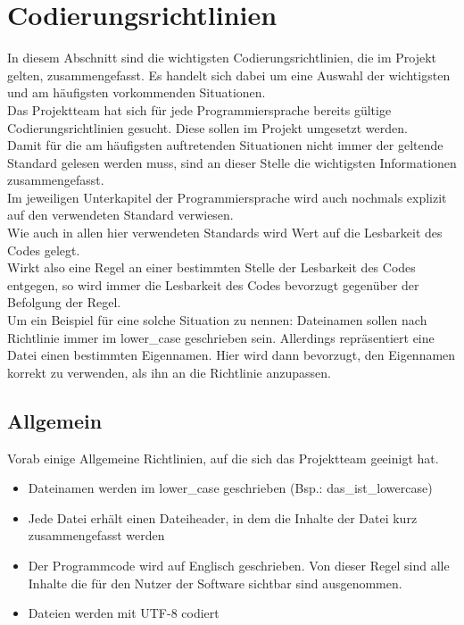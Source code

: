 
\chapter{Codierungsrichtlinien}
In diesem Abschnitt sind die wichtigsten Codierungsrichtlinien, die im Projekt gelten, zusammengefasst. Es handelt sich dabei um eine Auswahl der wichtigsten und am häufigsten vorkommenden Situationen.\\

Das Projektteam hat sich für jede Programmiersprache bereits gültige Codierungsrichtlinien gesucht. Diese sollen im Projekt umgesetzt werden. \\

Damit für die am häufigsten auftretenden Situationen nicht immer der geltende Standard gelesen werden muss, sind an dieser Stelle die wichtigsten Informationen zusammengefasst. \\

Im jeweiligen Unterkapitel der Programmiersprache wird auch nochmals explizit auf den verwendeten Standard verwiesen.\\

Wie auch in allen hier verwendeten Standards wird Wert auf die Lesbarkeit des Codes gelegt.\\
Wirkt also eine Regel an einer bestimmten Stelle der Lesbarkeit des Codes entgegen, so wird immer die Lesbarkeit des Codes bevorzugt gegenüber der Befolgung der Regel.\\
Um ein Beispiel für eine solche Situation zu nennen:
Dateinamen sollen nach Richtlinie immer im lower\_case geschrieben sein. Allerdings repräsentiert eine Datei einen bestimmten Eigennamen. Hier wird dann bevorzugt, den Eigennamen korrekt zu verwenden, als ihn an die Richtlinie anzupassen.\\
\section{Allgemein}
Vorab einige Allgemeine Richtlinien, auf die sich das Projektteam geeinigt hat.
\begin{itemize}
\item Dateinamen werden im lower\_case geschrieben (Bsp.: das\_ist\_lowercase)
\item Jede Datei erhält einen Dateiheader, in dem die Inhalte der Datei kurz zusammengefasst werden
\item Der Programmcode wird auf Englisch geschrieben. Von dieser Regel sind alle Inhalte die für den Nutzer der Software sichtbar sind ausgenommen.
\item Dateien werden mit UTF-8 codiert
\end{itemize}

